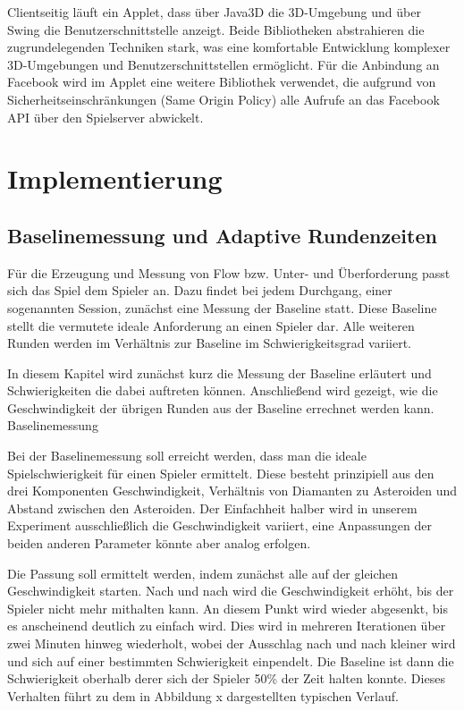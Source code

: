 \documentclass[a4paper,12pt]{scrartcl}
\begin{document}
Clientseitig läuft ein Applet, dass über Java3D die 3D-Umgebung und über Swing die
Benutzerschnittstelle anzeigt. Beide Bibliotheken abstrahieren die zugrundelegenden
Techniken stark, was eine komfortable Entwicklung komplexer 3D-Umgebungen und
Benutzerschnittstellen ermöglicht. Für die Anbindung an Facebook wird im Applet eine
weitere Bibliothek verwendet, die aufgrund von Sicherheitseinschränkungen (Same Origin
Policy) alle Aufrufe an das Facebook API über den Spielserver abwickelt.

\section{Implementierung}
\subsection{Baselinemessung und Adaptive Rundenzeiten}
Für die Erzeugung und Messung von Flow bzw. Unter- und Überforderung passt sich das
Spiel dem Spieler an. Dazu findet bei jedem Durchgang, einer sogenannten Session,
zunächst eine Messung der Baseline statt. Diese Baseline stellt die vermutete ideale
Anforderung an einen Spieler dar. Alle weiteren Runden werden im Verhältnis zur Baseline
im Schwierigkeitsgrad variiert.

In diesem Kapitel wird zunächst kurz die Messung der Baseline erläutert und
Schwierigkeiten die dabei auftreten können. Anschließend wird gezeigt, wie die
Geschwindigkeit der übrigen Runden aus der Baseline errechnet werden kann.
Baselinemessung

Bei der Baselinemessung soll erreicht werden, dass man die ideale Spielschwierigkeit für
einen Spieler ermittelt. Diese besteht prinzipiell aus den drei Komponenten Geschwindigkeit,
Verhältnis von Diamanten zu Asteroiden und Abstand zwischen den Asteroiden. Der
Einfachheit halber wird in unserem Experiment ausschließlich die Geschwindigkeit variiert,
eine Anpassungen der beiden anderen Parameter könnte aber analog erfolgen.

Die Passung soll ermittelt werden, indem zunächst alle auf der gleichen Geschwindigkeit
starten. Nach und nach wird die Geschwindigkeit erhöht, bis der Spieler nicht mehr mithalten
kann. An diesem Punkt wird wieder abgesenkt, bis es anscheinend deutlich zu einfach
wird. Dies wird in mehreren Iterationen über zwei Minuten hinweg wiederholt, wobei
der Ausschlag nach und nach kleiner wird und sich auf einer bestimmten Schwierigkeit
einpendelt. Die Baseline ist dann die Schwierigkeit oberhalb derer sich der
Spieler 50\% der Zeit halten konnte. Dieses Verhalten führt zu dem in Abbildung x dargestellten typischen
Verlauf.
\end{document}
